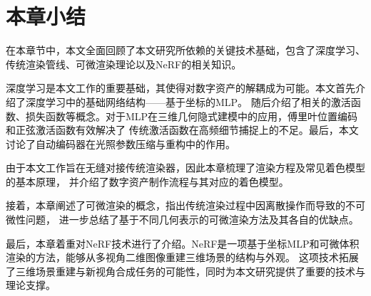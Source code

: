 \section{本章小结}
在本章节中，本文全面回顾了本文研究所依赖的关键技术基础，包含了深度学习、传统渲染管线、可微渲染理论以及NeRF的相关知识。

深度学习是本文工作的重要基础，其使得对数字资产的解耦成为可能。本文首先介绍了深度学习中的基础网络结构——基于坐标的MLP。
随后介绍了相关的激活函数、损失函数等概念。对于MLP在三维几何隐式建模中的应用，傅里叶位置编码和正弦激活函数有效解决了
传统激活函数在高频细节捕捉上的不足。最后，本文讨论了自动编码器在光照参数压缩与重构中的作用。

由于本文工作旨在无缝对接传统渲染器，因此本章梳理了渲染方程及常见着色模型的基本原理，
并介绍了数字资产制作流程与其对应的着色模型。

接着，本章阐述了可微渲染的概念，指出传统渲染过程中因离散操作而导致的不可微性问题，
进一步总结了基于不同几何表示的可微渲染方法及其各自的优缺点。

最后，本章着重对NeRF技术进行了介绍。NeRF是一项基于坐标MLP和可微体积渲染的方法，能够从多视角二维图像重建三维场景的结构与外观。
这项技术拓展了三维场景重建与新视角合成任务的可能性，同时为本文研究提供了重要的技术与理论支撑。
